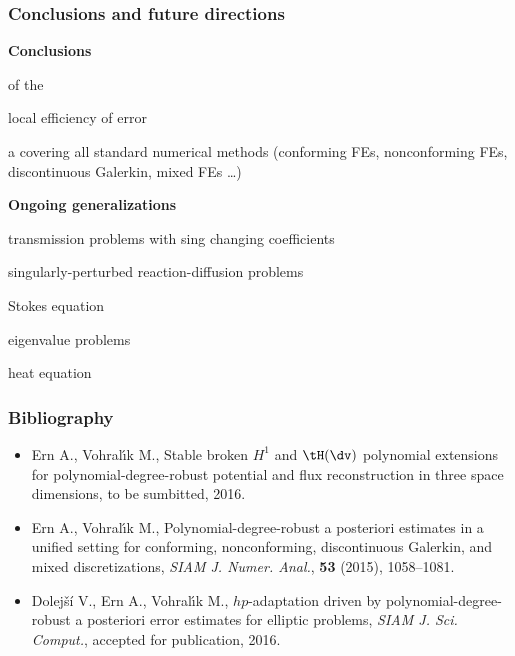 \documentclass[compress]{beamer}
\newcommand{\cblue}[1]{{\color{blue}{#1}}}
\begin{document}
\begin{frame}
\frametitle{Conclusions and future directions}

{\bf Conclusions}

\bi

\item \cblue{stability} of the \cblue{best piecewise polynomial
approximation}

\item \cblue{polynomial-degree-robust} local efficiency of \cblue{a
posteriori} error \cblue{estimates}

\item a \cblue{framework} covering all standard numerical methods (conforming
FEs, nonconforming FEs, discontinuous Galerkin, mixed FEs \ldots)

\ei

\pause

{\bf Ongoing generalizations}

\bi

\item transmission problems with sing changing coefficients

\item singularly-perturbed reaction-diffusion problems

\item Stokes equation

\item eigenvalue problems

\item heat equation

\ei

\end{frame}

\begin{frame}
    \frametitle{Bibliography}

    \vspace{-0.25cm}

    \begin{itemize}

    \item {\sc Ern A., Vohral\'\i k M.}, Stable broken $H^1$ and $\tH(\dv)$
    polynomial extensions for polynomial-degree-robust potential and flux
    reconstruction in three space dimensions, to be sumbitted, 2016.

    \item {\sc Ern A., Vohral\'\i k M.}, Polynomial-degree-robust a
    posteriori estimates in a unified setting for conforming,
    nonconforming, discontinuous Galerkin, and mixed discretizations, {\em
    SIAM J. Numer. Anal.}, {\bf 53} (2015), 1058--1081.

    \item {\sc Dolej\v s\'i V., Ern A., Vohral\'\i k M.}, $hp$-adaptation
    driven by polynomial-degree-robust a posteriori error estimates for
    elliptic problems, {\em SIAM J. Sci. Comput.}, accepted for
    publication, 2016.


    \end{itemize}

    \medskip
    \centerline{\cblue{\Large \bf Thank you for your attention!}}

\end{frame}
\end{document}
